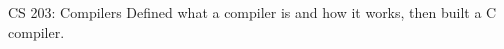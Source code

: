 

\begin{cvhonors}

  \cvhonor
    {CS 203: Compilers} %
    {Defined what a compiler is and how it works, then built a C compiler.} %


\end{cvhonors}